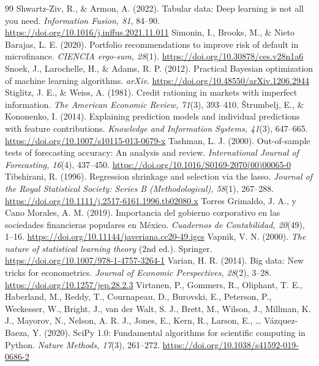 \begin{thebibliography}{99}
 Shwartz-Ziv, R., \& Armon, A. (2022). Tabular data: Deep learning is not all you need. \textit{Information Fusion, 81}, 84--90. \url{https://doi.org/10.1016/j.inffus.2021.11.011}
 Simonin, I., Brooks, M., \& Nieto Barajas, L. E. (2020). Portfolio recommendations to improve risk of default in microfinance. \textit{CIENCIA ergo-sum, 28}(1). \url{https://doi.org/10.30878/ces.v28n1a6}%
 Snoek, J., Larochelle, H., \& Adams, R. P. (2012). Practical Bayesian optimization of machine learning algorithms. \textit{arXiv}. \url{https://doi.org/10.48550/arXiv.1206.2944}
 Stiglitz, J. E., \& Weiss, A. (1981). Credit rationing in markets with imperfect information. \textit{The American Economic Review, 71}(3), 393--410.%
 Štrumbelj, E., \& Kononenko, I. (2014). Explaining prediction models and individual predictions with feature contributions. \textit{Knowledge and Information Systems, 41}(3), 647--665. \url{https://doi.org/10.1007/s10115-013-0679-x}%
 Tashman, L. J. (2000). Out-of-sample tests of forecasting accuracy: An analysis and review. \textit{International Journal of Forecasting, 16}(4), 437--450. \url{https://doi.org/10.1016/S0169-2070(00)00065-0}
 Tibshirani, R. (1996). Regression shrinkage and selection via the lasso. \textit{Journal of the Royal Statistical Society: Series B (Methodological), 58}(1), 267--288. \url{https://doi.org/10.1111/j.2517-6161.1996.tb02080.x}
 Torres Grimaldo, J. A., y Cano Morales, A. M. (2019). Importancia del gobierno corporativo en las sociedades financieras populares en México. \textit{Cuadernos de Contabilidad, 20}(49), 1--16. \url{https://doi.org/10.11144/javeriana.cc20-49.igcs}
 Vapnik, V. N. (2000). \textit{The nature of statistical learning theory} (2nd ed.). Springer. \url{https://doi.org/10.1007/978-1-4757-3264-1}
 Varian, H. R. (2014). Big data: New tricks for econometrics. \textit{Journal of Economic Perspectives, 28}(2), 3--28. \url{https://doi.org/10.1257/jep.28.2.3}
 Virtanen, P., Gommers, R., Oliphant, T. E., Haberland, M., Reddy, T., Cournapeau, D., Burovski, E., Peterson, P., Weckesser, W., Bright, J., van der Walt, S. J., Brett, M., Wilson, J., Millman, K. J., Mayorov, N., Nelson, A. R. J., Jones, E., Kern, R., Larson, E., \ldots{} Vázquez-Baeza, Y. (2020). SciPy 1.0: Fundamental algorithms for scientific computing in Python. \textit{Nature Methods, 17}(3), 261--272. \url{https://doi.org/10.1038/s41592-019-0686-2}

\end{thebibliography}
